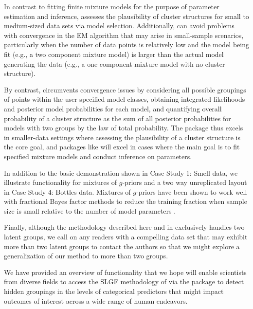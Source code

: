 In contrast to fitting finite mixture models for the purpose of parameter estimation and inference,  assesses the plausibility of cluster structures for small to medium-sized data sets via model selection. Additionally,  can avoid problems with convergence in the EM algorithm that may arise in small-sample scenarios, particularly when the number of data points is relatively low and the model being fit (e.g., a two component mixture model) is larger than the actual model generating the data (e.g., a one component mixture model with no cluster structure).

By contrast,  circumvents convergence issues by considering all possible groupings of points within the user-specified model classes, obtaining integrated likelihoods and posterior model probabilities for each model, and quantifying overall probability of a  cluster structure as the sum of all posterior probabilities for models with two groups by the law of total probability. The  package thus excels in smaller-data settings where assessing the plausibility of a cluster structure is the core goal, and packages like  will excel in cases where the main goal is to fit specified mixture models and conduct inference on parameters.

In addition to the basic  demonstration shown in {Case Study 1: Smell data}, we illustrate  functionality for mixtures of $g$-priors \citep{Liangetal} and a two way unreplicated layout in Case Study 4: Bottles data. Mixtures of $g$-priors have been shown to work well with fractional Bayes factor methods to reduce the training fraction when sample size is small relative to the number of model parameters \citep{technometrics_paper}.

Finally, although the methodology described here and in \citet{technometrics_paper} exclusively handles two latent groups, we call on any readers with a compelling data set that may exhibit more than two latent groups to contact the authors so that we might explore a generalization of our method to more than two groups.  

We have provided an overview of functionality that we hope will enable scientists from diverse fields to access the SLGF methodology of \cite{technometrics_paper} via the  package to detect hidden groupings in the levels of categorical predictors that might impact outcomes of interest across a wide range of human endeavors.  

